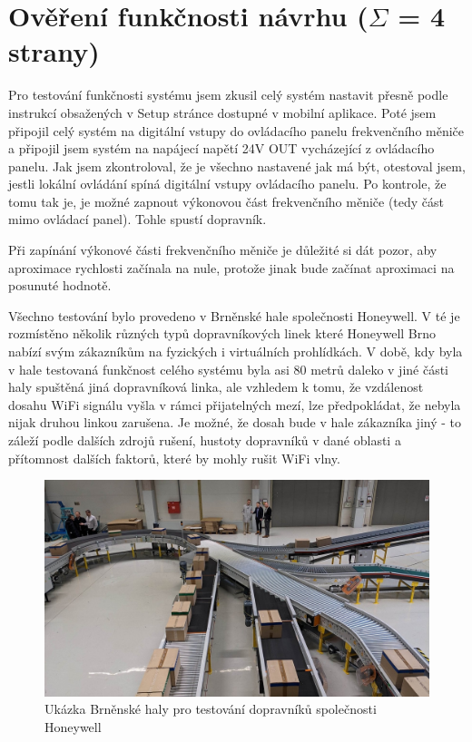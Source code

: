 \chapter{Ověření funkčnosti návrhu ($\Sigma$ = 4 strany)}
Pro testování funkčnosti systému jsem zkusil celý systém nastavit přesně podle instrukcí obsažených v Setup stránce dostupné v mobilní aplikace. Poté jsem připojil celý systém na digitální vstupy do ovládacího panelu frekvenčního měniče a připojil jsem systém na napájecí napětí 24V OUT vycházející z ovládacího panelu. Jak jsem zkontroloval, že je všechno nastavené jak má být, otestoval jsem, jestli lokální ovládání spíná digitální vstupy ovládacího panelu. Po kontrole, že tomu tak je, je možné zapnout výkonovou část frekvenčního měniče (tedy část mimo ovládací panel). Tohle spustí dopravník.

Při zapínání výkonové části frekvenčního měniče je důležité si dát pozor, aby aproximace rychlosti začínala na nule, protože jinak bude začínat aproximaci na posunuté hodnotě.

Všechno testování bylo provedeno v Brněnské hale společnosti Honeywell. V té je rozmístěno několik různých typů dopravníkových linek které Honeywell Brno nabízí svým zákazníkům na fyzických i virtuálních prohlídkách. V době, kdy byla v hale testovaná funkčnost celého systému byla asi 80 metrů daleko v jiné části haly spuštěná jiná dopravníková linka, ale vzhledem k tomu, že vzdálenost dosahu WiFi signálu vyšla v rámci přijatelných mezí, lze předpokládat, že nebyla nijak druhou linkou zarušena. Je možné, že dosah bude v hale zákazníka jiný - to záleží podle dalších zdrojů rušení, hustoty dopravníků v dané oblasti a přítomnost dalších faktorů, které by mohly rušit WiFi vlny.

\begin{figure}
    \centering
    \includegraphics[width=1\linewidth]{images/BrnenskaHoneywellHala.png}
    \caption{Ukázka Brněnské haly pro testování dopravníků společnosti Honeywell \cite{HoneywellHala}}
    \label{fig:BrnenskaHoneywellHala}
\end{figure}

